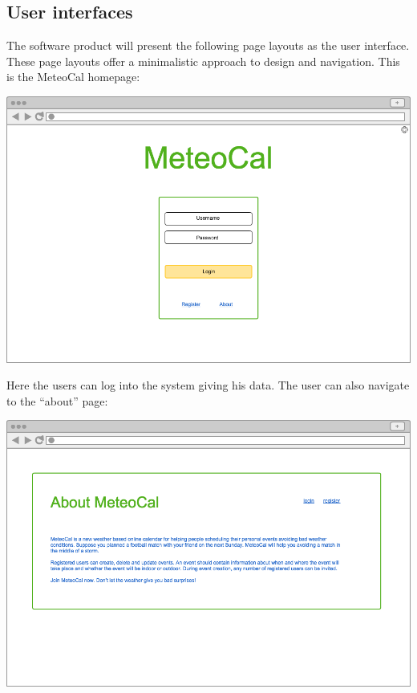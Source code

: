 \documentclass[10pt,a4paper,titlepage]{article}
\begin{document}
\subsection{User interfaces}
The software product will present the following page layouts as the user interface. These
page layouts offer a minimalistic approach to design and navigation.
This is the MeteoCal homepage:

\vspace{2mm}\includegraphics[width={\linewidth}]{./UI_mockups/01-login.png}\vspace{3mm}

Here the users can log into the system giving his data. The user can also navigate to the “about” page:

\vspace{3mm}\includegraphics[width={\linewidth}]{./UI_mockups/02-about.png}\vspace{3mm}
\end{document}
